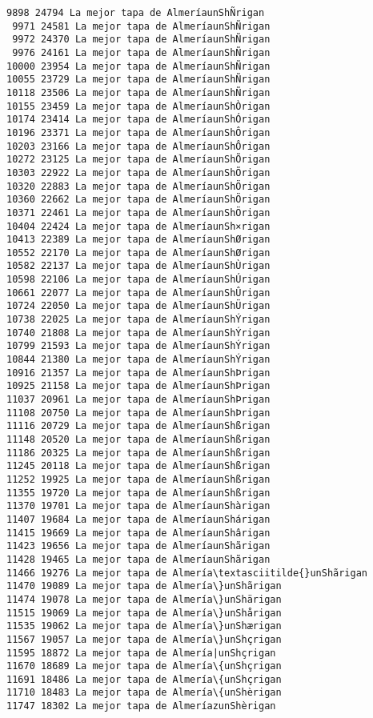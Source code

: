 \documentclass[11pt]{article}
\begin{document}
\begin{Verbatim}[commandchars=\\\{\}]
 9898 24794 La mejor tapa de AlmeríaunShÑrigan
 9971 24581 La mejor tapa de AlmeríaunShÑrigan
 9972 24370 La mejor tapa de AlmeríaunShÑrigan
 9976 24161 La mejor tapa de AlmeríaunShÑrigan
10000 23954 La mejor tapa de AlmeríaunShÑrigan
10055 23729 La mejor tapa de AlmeríaunShÑrigan
10118 23506 La mejor tapa de AlmeríaunShÑrigan
10155 23459 La mejor tapa de AlmeríaunShÒrigan
10174 23414 La mejor tapa de AlmeríaunShÓrigan
10196 23371 La mejor tapa de AlmeríaunShÔrigan
10203 23166 La mejor tapa de AlmeríaunShÔrigan
10272 23125 La mejor tapa de AlmeríaunShÕrigan
10303 22922 La mejor tapa de AlmeríaunShÕrigan
10320 22883 La mejor tapa de AlmeríaunShÖrigan
10360 22662 La mejor tapa de AlmeríaunShÖrigan
10371 22461 La mejor tapa de AlmeríaunShÖrigan
10404 22424 La mejor tapa de AlmeríaunSh×rigan
10413 22389 La mejor tapa de AlmeríaunShØrigan
10552 22170 La mejor tapa de AlmeríaunShØrigan
10582 22137 La mejor tapa de AlmeríaunShÙrigan
10598 22106 La mejor tapa de AlmeríaunShÚrigan
10661 22077 La mejor tapa de AlmeríaunShÛrigan
10724 22050 La mejor tapa de AlmeríaunShÜrigan
10738 22025 La mejor tapa de AlmeríaunShÝrigan
10740 21808 La mejor tapa de AlmeríaunShÝrigan
10799 21593 La mejor tapa de AlmeríaunShÝrigan
10844 21380 La mejor tapa de AlmeríaunShÝrigan
10916 21357 La mejor tapa de AlmeríaunShÞrigan
10925 21158 La mejor tapa de AlmeríaunShÞrigan
11037 20961 La mejor tapa de AlmeríaunShÞrigan
11108 20750 La mejor tapa de AlmeríaunShÞrigan
11116 20729 La mejor tapa de AlmeríaunShßrigan
11148 20520 La mejor tapa de AlmeríaunShßrigan
11186 20325 La mejor tapa de AlmeríaunShßrigan
11245 20118 La mejor tapa de AlmeríaunShßrigan
11252 19925 La mejor tapa de AlmeríaunShßrigan
11355 19720 La mejor tapa de AlmeríaunShßrigan
11370 19701 La mejor tapa de AlmeríaunShàrigan
11407 19684 La mejor tapa de AlmeríaunShárigan
11415 19669 La mejor tapa de AlmeríaunShârigan
11423 19656 La mejor tapa de AlmeríaunShãrigan
11428 19465 La mejor tapa de AlmeríaunShãrigan
11466 19276 La mejor tapa de Almería\textasciitilde{}unShãrigan
11470 19089 La mejor tapa de Almería\}unShãrigan
11474 19078 La mejor tapa de Almería\}unShärigan
11515 19069 La mejor tapa de Almería\}unShårigan
11535 19062 La mejor tapa de Almería\}unShærigan
11567 19057 La mejor tapa de Almería\}unShçrigan
11595 18872 La mejor tapa de Almería|unShçrigan
11670 18689 La mejor tapa de Almería\{unShçrigan
11691 18486 La mejor tapa de Almería\{unShçrigan
11710 18483 La mejor tapa de Almería\{unShèrigan
11747 18302 La mejor tapa de AlmeríazunShèrigan

\end{Verbatim}
\end{document}
